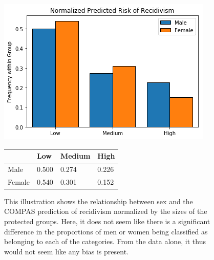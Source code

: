 \documentclass[11pt, fleqn, titlepage]{article}
\begin{document}
	\begin{figure}[H]
		\centering
		\includegraphics[width=0.5\linewidth]{imgs/normalized_recid_sex}
		\begin{table}[H]
			\centering
			\begin{tabular}{|l|l|l|l|}
				\hline
				& Low   & Medium & High  \\ \hline
				Male      & 0.500 & 0.274  & 0.226 \\ \hline
				Female    & 0.540 & 0.301  & 0.152 \\ \hline
			\end{tabular}
		\end{table}
		\caption{This illustration shows the relationship between sex and the COMPAS prediction of recidivism normalized by the sizes of the protected groups. Here, it does not seem like there is a significant difference in the proportions of men or women being classified as belonging to each of the categories. From the data alone, it thus would not seem like any bias is present.}
		\label{fig:predictedrecidsex}
	\end{figure}
	
\end{document}
